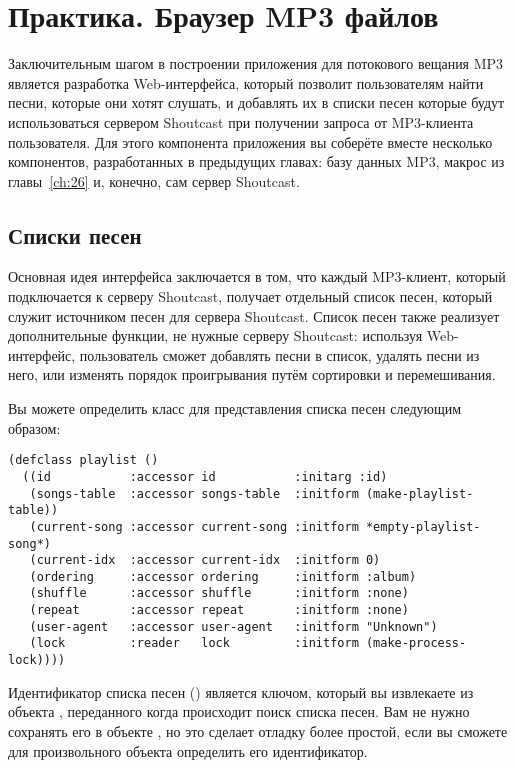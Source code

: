 \chapter{Практика. Браузер MP3 файлов}
\label{ch:29}

Заключительным шагом в построении приложения для потокового вещания MP3 является
разработка Web-интерфейса, который позволит пользователям найти песни, которые они хотят
слушать, и добавлять их в списки песен которые будут использоваться сервером Shoutcast при
получении запроса от MP3-клиента пользователя.  Для этого компонента приложения вы
соберёте вместе несколько компонентов, разработанных в предыдущих главах: базу данных MP3,
макрос  из главы~\ref{ch:26} и, конечно, сам сервер Shoutcast.

\section{Списки песен}

Основная идея интерфейса заключается в том, что каждый MP3-клиент, который подключается к
серверу Shoutcast, получает отдельный список песен, который служит источником песен для
сервера Shoutcast.  Список песен также реализует дополнительные функции, не нужные серверу
Shoutcast: используя Web-интерфейс, пользователь сможет добавлять песни в список, удалять
песни из него, или изменять порядок проигрывания путём сортировки и перемешивания.

Вы можете определить класс для представления списка песен следующим образом:

\begin{lstlisting}
(defclass playlist ()
  ((id           :accessor id           :initarg :id)
   (songs-table  :accessor songs-table  :initform (make-playlist-table))
   (current-song :accessor current-song :initform *empty-playlist-song*)
   (current-idx  :accessor current-idx  :initform 0)
   (ordering     :accessor ordering     :initform :album)
   (shuffle      :accessor shuffle      :initform :none)
   (repeat       :accessor repeat       :initform :none)
   (user-agent   :accessor user-agent   :initform "Unknown")
   (lock         :reader   lock         :initform (make-process-lock))))
\end{lstlisting}

Идентификатор списка песен () является ключом, который вы извлекаете из объекта
, переданного  когда происходит поиск списка песен.
Вам не нужно сохранять его в объекте , но это сделает отладку более
простой, если вы сможете для произвольного объекта  определить его
идентификатор.

